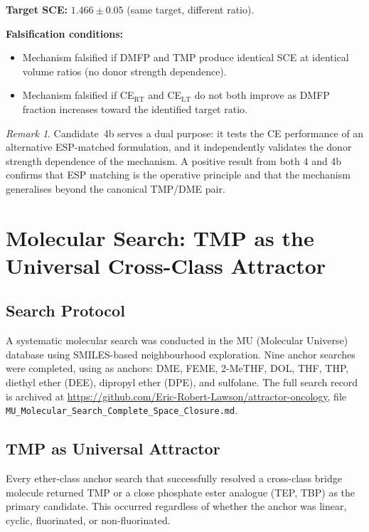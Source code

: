 \documentclass[11pt]{article}
\theoremstyle{plain}
\theoremstyle{definition}
\theoremstyle{remark}
\newtheorem{remark}{Remark}[section]
\begin{document}
\textbf{Target SCE:} $1.466 \pm 0.05$ (same target, different ratio).

\textbf{Falsification conditions:}
\begin{itemize}[leftmargin=2em]
  \item Mechanism falsified if DMFP and TMP produce identical SCE at
        identical volume ratios (no donor strength dependence).
  \item Mechanism falsified if CE$_{\mathrm{RT}}$ and CE$_{\mathrm{LT}}$
        do not both improve as DMFP fraction increases toward the
        identified target ratio.
\end{itemize}

\begin{remark}
Candidate~4b serves a dual purpose: it tests the CE performance of an
alternative ESP-matched formulation, and it independently validates the
donor strength dependence of the mechanism.  A positive result from both
4 and 4b confirms that ESP matching is the operative principle and that
the mechanism generalises beyond the canonical TMP/DME pair.
\end{remark}

\section{Molecular Search: TMP as the Universal Cross-Class Attractor}
\label{sec:molecular_search}

\subsection{Search Protocol}

A systematic molecular search was conducted in the MU (Molecular Universe)
database using SMILES-based neighbourhood exploration.  Nine anchor
searches were completed, using as anchors: DME, FEME, 2-MeTHF, DOL,
THF, THP, diethyl ether (DEE), dipropyl ether (DPE), and sulfolane.
The full search record is archived at
\url{https://github.com/Eric-Robert-Lawson/attractor-oncology},
file \texttt{MU\_Molecular\_Search\_Complete\_Space\_Closure.md}.

\subsection{TMP as Universal Attractor}

Every ether-class anchor search that successfully resolved a
cross-class bridge molecule returned TMP or a close phosphate ester
analogue (TEP, TBP) as the primary candidate.  This occurred regardless
of whether the anchor was linear, cyclic, fluorinated, or non-fluorinated.
\end{document}
